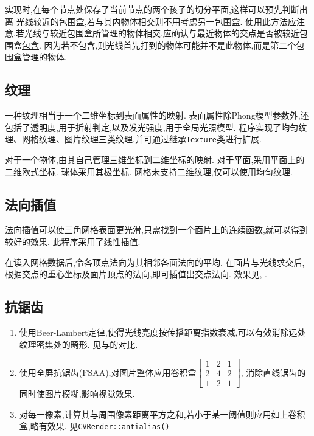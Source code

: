 实现时,在每个节点处保存了当前节点的两个孩子的切分平面,这样可以预先判断出离
光线较近的包围盒,若与其内物体相交则不用考虑另一包围盒.
使用此方法应注意,若光线与较近包围盒所管理的物体相交,应确认与最近物体的交点是否被较近包围盒\underline{包含}.
因为若不包含,则光线首先打到的物体可能并不是此物体,而是第二个包围盒管理的物体.

\subsection{纹理}
一种纹理相当于一个二维坐标到表面属性的映射.
表面属性除Phong模型参数外,还包括了透明度,用于折射判定,以及发光强度,用于全局光照模型.
程序实现了均匀纹理、网格纹理、图片纹理三类纹理,并可通过继承\verb|Texture|类进行扩展.

对于一个物体,由其自己管理三维坐标到二维坐标的映射.
对于平面,采用平面上的二维欧式坐标. 球体采用其极坐标.
网格未支持二维纹理,仅可以使用均匀纹理.

\subsection{法向插值}
\label{sec:smooth}
法向插值可以使三角网格表面更光滑,只需找到一个面片上的连续函数,就可以得到较好的效果.
此程序采用了线性插值.

在读入网格数据后,令各顶点法向为其相邻各面法向的平均.
在面片与光线求交后,根据交点的重心坐标及面片顶点的法向,即可插值出交点法向.
效果见, .

\subsection{抗锯齿}
\begin{enumerate}
  \item 使用Beer-Lambert定律\cite{beer},使得光线亮度按传播距离指数衰减,可以有效消除远处纹理密集处的畸形.
    见与的对比.

  \item 使用全屏抗锯齿(FSAA),对图片整体应用卷积盒$\begin{bmatrix}1 & 2 & 1\\2 & 4 & 2\\1 & 2 & 1\end{bmatrix} $,
    消除直线锯齿的同时使图片模糊,影响视觉效果.

  \item 对每一像素,计算其与周围像素距离平方之和,若小于某一阈值则应用如上卷积盒,略有效果. 见\verb|CVRender::antialias()|
\end{enumerate}

